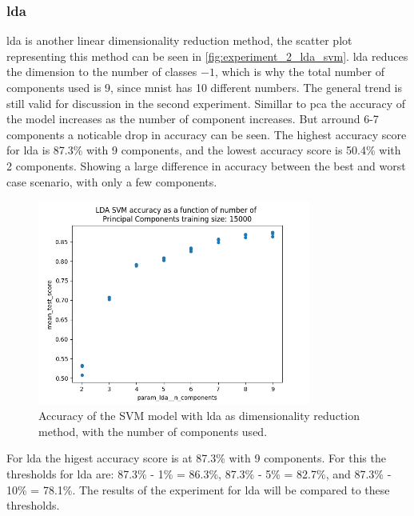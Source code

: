 \subsubsection{\gls{lda}}\label{subsubsec:experiment_2_lda}
\gls{lda} is another linear dimensionality reduction method, the scatter plot representing this method can be seen in \autoref{fig:experiment_2_lda_svm}. \gls{lda} reduces the dimension to the number of classes $-1$, which is why the total number of components used is 9, since \gls{mnist} has 10 different numbers. The general trend is still valid for discussion in the second experiment.
Simillar to \gls{pca} the accuracy of the model increases as the number of component increases. But arround 6-7 components a noticable drop in accuracy can be seen. The highest accuracy score for \gls{lda} is 87.3\% with 9 components, and the lowest accuracy score is 50.4\% with 2 components. Showing a large difference in accuracy between the best and worst case scenario, with only a few components.

\begin{figure}[htb!]
    \centering
    \includegraphics[width=0.8\textwidth]{figures/experiment_two/lda_svm_15000.png}
    \caption{Accuracy of the SVM model with \gls{lda} as dimensionality reduction method, with the number of components used.}
    \label{fig:experiment_2_lda_svm}
\end{figure}

For \gls{lda} the higest accuracy score is at 87.3\% with 9 components. For this the thresholds for \gls{lda} are: 87.3\% - 1\% = 86.3\%, 87.3\% - 5\% = 82.7\%, and 87.3\% - 10\% = 78.1\%. The results of the experiment for \gls{lda} will be compared to these thresholds.

